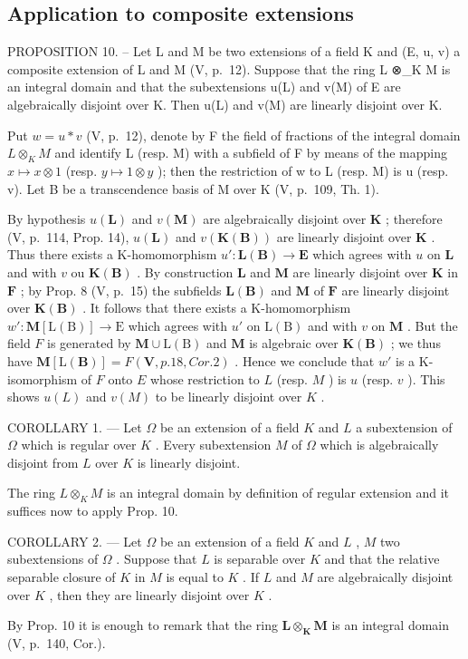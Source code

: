 \subsection{Application to composite extensions}

PROPOSITION 10. -- Let L and M be two extensions of a field K and (E, u, v) a composite extension of L and M (V, p.~12). Suppose that the ring L ⊗\_K M is an integral domain and that the subextensions u(L) and v(M) of E are algebraically disjoint over K. Then u(L) and v(M) are linearly disjoint over K.

Put \(w = u * v\) (V, p.~12), denote by F the field of fractions of the integral domain \(L \otimes_{K} M\) and identify L (resp. M) with a subfield of F by means of the mapping \(x \mapsto x \otimes 1\) (resp. \(y \mapsto 1 \otimes y\) ); then the restriction of w to L (resp. M) is u (resp. v). Let B be a transcendence basis of M over K (V, p.~109, Th. 1).

By hypothesis \(u(\mathbf{L})\) and \(v(\mathbf{M})\) are algebraically disjoint over \(\mathbf{K}\) ; therefore (V, p.~114, Prop. 14), \(u(\mathbf{L})\) and \(v(\mathbf{K}(\mathbf{B}))\) are linearly disjoint over \(\mathbf{K}\) . Thus there exists a K-homomorphism \(u': \mathbf{L}(\mathbf{B}) \to \mathbf{E}\) which agrees with \(u\) on \(\mathbf{L}\) and with \(v\) ou \(\mathbf{K}(\mathbf{B})\) . By construction \(\mathbf{L}\) and \(\mathbf{M}\) are linearly disjoint over \(\mathbf{K}\) in \(\mathbf{F}\) ; by Prop. 8 (V, p.~15) the subfields \(\mathbf{L}(\mathbf{B})\) and \(\mathbf{M}\) of \(\mathbf{F}\) are linearly disjoint over \(\mathbf{K}(\mathbf{B})\) . It follows that there exists a K-homomorphism \(w' \colon \mathbf{M}[\mathrm{L}(\mathrm{B})] \to \mathrm{E}\) which agrees with \(u'\) on \(\mathrm{L}(\mathrm{B})\) and with \(v\) on \(\mathbf{M}\) . But the field \(F\) is generated by \(\mathbf{M} \cup \mathrm{L}(\mathrm{B})\) and \(\mathbf{M}\) is algebraic over \(\mathbf{K}(\mathbf{B})\) ; we thus have \(\mathbf{M}[\mathrm{L}(\mathbf{B})] = F(\mathbf{V}, p. 18, Cor. 2)\) . Hence we conclude that \(w'\) is a K-isomorphism of \(F\) onto \(E\) whose restriction to \(L\) (resp. \(M\) ) is \(u\) (resp. \(v\) ). This shows \(u(L)\) and \(v(M)\) to be linearly disjoint over \(K\) .

COROLLARY 1. --- Let \(\Omega\) be an extension of a field \(K\) and \(L\) a subextension of \(\Omega\) which is regular over \(K\) . Every subextension \(M\) of \(\Omega\) which is algebraically disjoint from \(L\) over \(K\) is linearly disjoint.

The ring \(L \otimes_{K} M\) is an integral domain by definition of regular extension and it suffices now to apply Prop. 10.

COROLLARY 2. --- Let \(\Omega\) be an extension of a field \(K\) and \(L\) , \(M\) two subextensions of \(\Omega\) . Suppose that \(L\) is separable over \(K\) and that the relative separable closure of \(K\) in \(M\) is equal to \(K\) . If \(L\) and \(M\) are algebraically disjoint over \(K\) , then they are linearly disjoint over \(K\) .

By Prop. 10 it is enough to remark that the ring \(\mathbf{L} \otimes_{\mathbf{K}} \mathbf{M}\) is an integral domain (V, p.~140, Cor.).

